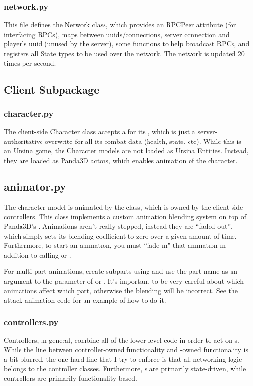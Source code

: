 \documentclass{article}
\begin{document}
\subsubsection{network.py}
This file defines the Network class, which provides an RPCPeer attribute (for interfacing
RPCs), maps between uuids/connections, server connection and player's uuid (unused by
the server), some functions to help broadcast RPCs, and registers all State types to
be used over the network. The network is updated 20 times per second.

\subsection{Client Subpackage}
\subsubsection{character.py}
The client-side Character class accepts a  for its ,
which is just a server-authoritative overwrite for all its combat data (health, stats, etc).
While this is an Ursina game, the Character models are not loaded as Ursina Entities. Instead,
they are loaded as Panda3D actors, which enables animation of the character. 
\subsection{animator.py}
The character model is animated by the  class, which is owned by the client-side
controllers. This class implements a custom animation blending system on top of Panda3D's
. Animations aren't really stopped, instead they are ``faded
out'', which simply sets its blending coefficient to zero over a given amount of time.
Furthermore, to start an animation, you must ``fade in'' that animation in addition to calling
 or .

For multi-part animations, create subparts using  and use the
part name as an argument to the  parameter of  or
. It's important to be very careful about which animations affect
which part, otherwise the blending will be incorrect. See the attack animation code for
an example of how to do it.

\subsubsection{controllers.py}
Controllers, in general, combine all of the lower-level code in order to act on s.
While the line between controller-owned functionality and -owned functionality
is a bit blurred, the one hard line that I try to enforce is that all networking logic belongs
to the controller classes. Furthermore, s are primarily state-driven, while
controllers are primarily functionality-based. 
\end{document}
